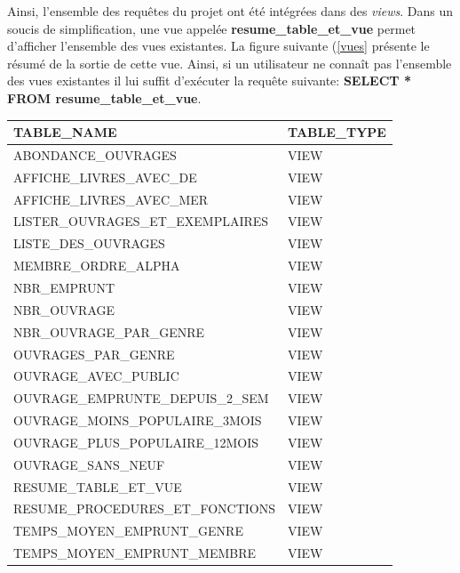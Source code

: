 \documentclass[11pt,a4paper]{article}
\begin{document}
Ainsi, l'ensemble des requêtes du projet ont été intégrées dans des \textit{views}. Dans un soucis de simplification, une vue appelée \textbf{resume\_table\_et\_vue} permet d'afficher l'ensemble des vues existantes. La figure suivante (\ref{vues} présente le résumé de la sortie de cette vue. Ainsi, si un utilisateur ne connaît pas l'ensemble des vues existantes il lui suffit d'exécuter la requête suivante: \textbf{SELECT * FROM resume\_table\_et\_vue}.


\begin{table}[h!]
    \centering
    \begin{tabular}{@{}l|l|@{}}
    \toprule
    TABLE\_NAME & TABLE\_TYPE \\ \midrule
    \multicolumn{1}{|l|}{ABONDANCE\_OUVRAGES} & VIEW \\
    \multicolumn{1}{|l|}{AFFICHE\_LIVRES\_AVEC\_DE} & VIEW \\
    \multicolumn{1}{|l|}{AFFICHE\_LIVRES\_AVEC\_MER} & VIEW \\
    \multicolumn{1}{|l|}{LISTER\_OUVRAGES\_ET\_EXEMPLAIRES} & VIEW \\
    \multicolumn{1}{|l|}{LISTE\_DES\_OUVRAGES} & VIEW \\
    \multicolumn{1}{|l|}{MEMBRE\_ORDRE\_ALPHA} & VIEW \\
    \multicolumn{1}{|l|}{NBR\_EMPRUNT} & VIEW \\
    \multicolumn{1}{|l|}{NBR\_OUVRAGE} & VIEW \\
    \multicolumn{1}{|l|}{NBR\_OUVRAGE\_PAR\_GENRE} & VIEW \\
    \multicolumn{1}{|l|}{OUVRAGES\_PAR\_GENRE} & VIEW \\
    \multicolumn{1}{|l|}{OUVRAGE\_AVEC\_PUBLIC} & VIEW \\
    \multicolumn{1}{|l|}{OUVRAGE\_EMPRUNTE\_DEPUIS\_2\_SEM} & VIEW \\
    \multicolumn{1}{|l|}{OUVRAGE\_MOINS\_POPULAIRE\_3MOIS} & VIEW \\
    \multicolumn{1}{|l|}{OUVRAGE\_PLUS\_POPULAIRE\_12MOIS} & VIEW \\
    \multicolumn{1}{|l|}{OUVRAGE\_SANS\_NEUF} & VIEW \\
    \multicolumn{1}{|l|}{RESUME\_TABLE\_ET\_VUE} & VIEW \\
    \multicolumn{1}{|l|}{RESUME\_PROCEDURES\_ET\_FONCTIONS} & VIEW \\
    \multicolumn{1}{|l|}{TEMPS\_MOYEN\_EMPRUNT\_GENRE} & VIEW \\
    \multicolumn{1}{|l|}{TEMPS\_MOYEN\_EMPRUNT\_MEMBRE} & VIEW \\ \midrule

\end{tabular}
\end{table}
\end{document}
